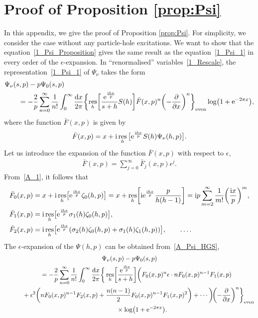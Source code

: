 \documentclass[10pt,a4paper]{amsart}
\numberwithin{equation}{section}
\DeclareMathOperator{\res}{res}
\begin{document}
\section{Proof of Proposition \ref{prop:Psi}}\label{appendix:PsiProof}
In this appendix, we give the proof of Proposition \ref{prop:Psi}. For simplicity, we consider the case without any particle-hole excitations. We want to show that the equation~\eqref{1_Psi_Proposition} gives the same result as the equation~\eqref{1_Psi_1} in every order of the $\epsilon$-expansion. In ``renormalised'' variables~\eqref{1_Rescale}, the representation~\eqref{1_Psi_1} of $\Psi_\nu$ takes the form
\begin{align}
&\Psi_\nu(s, p)-p\Psi_0(s, p) \nonumber\\
&\qquad{}=-\frac{2}{p} \sum_{n=0}^{\infty} \frac{1}{n!} \int_{0}^{\infty} \frac{{\rm d}x}{2\pi}
        \biggl\{\res_h\biggl[ \frac{{\rm e}^{\frac{{\rm i}hx}{p}}}{s+h} S(h) \biggr] \bar{F}(x, p)^n \biggl(-\frac{\partial}{\partial x}\biggr)^n \biggr\}_{\text{even}}\log\bigl(1+{\rm e}^{-2\pi x}\bigr),\label{A_Psi_HGS}
\end{align}
where the function $\bar{F}(x, p)$ is given by
\begin{align}\label{A_1}
\bar{F}(x, p)=x+{\rm i}\res_h\big[ {\rm e}^{\frac{{\rm i}hx}{p}} S(h)\Psi_\nu(h, p) \big].
\end{align}
Let us introduce the expansion of the function $\bar{F}(x, p)$ with respect to $\epsilon$,
\begin{align*}
\bar{F}(x, p)=\sum_{j=0}^{\infty} \bar{F}_j(x, p) \epsilon^j.
\end{align*}
From~\eqref{A_1}, it follows that
\begin{align}
&\bar{F}_0(x, p)=x+{\rm i}\res_h\bigl[ {\rm e}^{\frac{{\rm i}hx}{p}} \zeta_0(h, p) \bigr] = x+\res_h\biggl[ {\rm i} {\rm e}^{\frac{{\rm i}hx}{p}} \frac{p}{h(h-1)} \biggr] = {\rm i}p \sum_{m=2}^{\infty} \frac{1}{m!} \biggl(\frac{{\rm i}x}{p}\biggr)^m, \nonumber\\
&\bar{F}_1(x, p)={\rm i}\res_h\bigl[ {\rm e}^{\frac{{\rm i}hx}{p}} \sigma_1(h)\zeta_0(h, p) \bigr], \cr
&\bar{F}_2(x, p)={\rm i}\res_h\bigl[ {\rm e}^{\frac{{\rm i}hx}{p}} (\sigma_2(h)\zeta_0(h, p) + \sigma_1(h)\zeta_1(h, p)) \bigr], \qquad \dots.
\label{A_F_Epsilon}
\end{align}
The $\epsilon$-expansion of the $\Psi(h, p)$ can be obtained from~\eqref{A_Psi_HGS},
\begin{gather}
\Psi_\nu(s, p)-p\Psi_0(s, p)\nonumber\\
\qquad{}=-\frac{2}{p} \sum_{n=0}^{\infty} \frac{1}{n!} \int_{0}^{\infty} \frac{{\rm d}x}{2\pi}
        \bigg\{ \res_h\biggl[ \frac{{\rm e}^{\frac{{\rm i}hx}{p}}}{s+h} \biggr]
        \bigg(F_0(x, p)^n
              \epsilon\cdot nF_0(x, p)^{n-1}F_1(x, p)  \cr
\qquad\hphantom{=}{} +\epsilon^2 \biggl(nF_0(x, p)^{n-1}F_2(x, p) + \frac{n(n-1)}{2}F_0(x, p)^{n-1}F_1(x, p)^2\biggr) + \cdots \bigg) \! \biggl(-\frac{\partial}{\partial x}\biggr)^n \bigg\}_{\text{even}} \cr
\qquad\hphantom{=+}{}\times \log\bigl(1+{\rm e}^{-2\pi x}\bigr).\label{A_HGS_Epsilon}
\end{gather}
\end{document}
